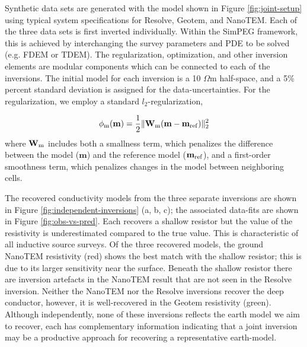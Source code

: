 \documentclass[paper]{geophysics}
\begin{document}

Synthetic data sets are generated with the model shown in Figure \ref{fig:joint-setup} using  typical system specifications for Resolve, Geotem, and NanoTEM. Each of the three data sets is first inverted individually. Within the SimPEG framework, this is achieved by interchanging the survey parameters and PDE to be solved (e.g. FDEM or TDEM). The regularization, optimization, and other inversion elements are modular components which can be connected to each of the inversions. The initial model for each inversion is a 10 $\Omega$m half-space, and a 5\% percent standard deviation is assigned for the data-uncertainties. For the regularization, we employ a standard $l_2$-regularization,

\begin{equation}
\phi_{\rm m}(\mathbf{m}) = \frac{1}{2} \| \mathbf{W}_{\rm m} (\mathbf{m} - \mathbf{m}_{\rm ref}) \|_2^2
\label{eq:l2-regularization}
\end{equation}
where $\mathbf{W}_{\rm m}$ includes both a smallness term, which penalizes the difference between the model ($\mathbf{m}$) and the reference model ($\mathbf{m}_{\rm ref}$), and a first-order smoothness term, which penalizes changes in the model between neighboring cells.

The recovered conductivity  models from the three separate inversions are shown in Figure \ref{fig:independent-inversions} (a, b, c); the associated data-fits are shown in Figure \ref{fig:obs-vs-pred}. Each recovers a shallow resistor but the value of the resistivity is underestimated compared to the true value. This is characteristic of all inductive source surveys. Of the three recovered models, the ground NanoTEM resistivity (red) shows the best match with the shallow resistor; this is due to its larger sensitivity  near the surface. Beneath the shallow resistor there are inversion artefacts in the NanoTEM result that are not seen in the Resolve inversion. Neither the NanoTEM nor the  Resolve inversions recover the deep conductor, however, it is well-recovered in the Geotem resistivity (green).  Although independently, none of these inversions reflects the earth model we aim to recover, each has complementary information indicating that a joint inversion may be a productive approach for recovering a representative earth-model.
\end{document}
